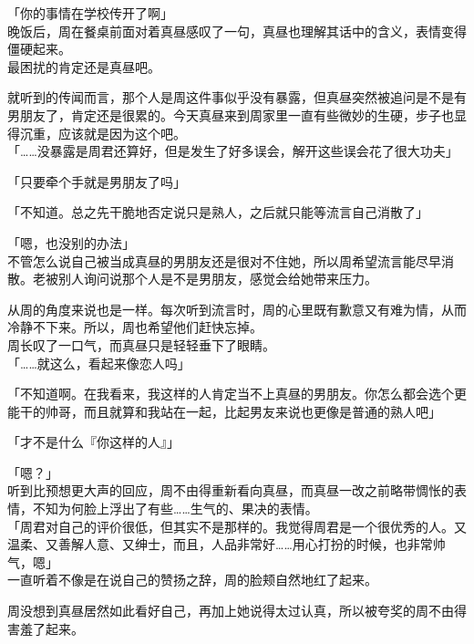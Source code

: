 「你的事情在学校传开了啊」\\

晚饭后，周在餐桌前面对着真昼感叹了一句，真昼也理解其话中的含义，表情变得僵硬起来。\\

最困扰的肯定还是真昼吧。

就听到的传闻而言，那个人是周这件事似乎没有暴露，但真昼突然被追问是不是有男朋友了，肯定还是很累的。今天真昼来到周家里一直有些微妙的生硬，步子也显得沉重，应该就是因为这个吧。\\

「……没暴露是周君还算好，但是发生了好多误会，解开这些误会花了很大功夫」

「只要牵个手就是男朋友了吗」

「不知道。总之先干脆地否定说只是熟人，之后就只能等流言自己消散了」

「嗯，也没别的办法」\\

不管怎么说自己被当成真昼的男朋友还是很对不住她，所以周希望流言能尽早消散。老被别人询问说那个人是不是男朋友，感觉会给她带来压力。

从周的角度来说也是一样。每次听到流言时，周的心里既有歉意又有难为情，从而冷静不下来。所以，周也希望他们赶快忘掉。\\

周长叹了一口气，而真昼只是轻轻垂下了眼睛。\\

「……就这么，看起来像恋人吗」

「不知道啊。在我看来，我这样的人肯定当不上真昼的男朋友。你怎么都会选个更能干的帅哥，而且就算和我站在一起，比起男友来说也更像是普通的熟人吧」

「才不是什么『你这样的人』」

「嗯？」\\

听到比预想更大声的回应，周不由得重新看向真昼，而真昼一改之前略带惆怅的表情，不知为何脸上浮出了有些……生气的、果决的表情。\\

「周君对自己的评价很低，但其实不是那样的。我觉得周君是一个很优秀的人。又温柔、又善解人意、又绅士，而且，人品非常好……用心打扮的时候，也非常帅气，嗯」\\

一直听着不像是在说自己的赞扬之辞，周的脸颊自然地红了起来。

周没想到真昼居然如此看好自己，再加上她说得太过认真，所以被夸奖的周不由得害羞了起来。\\

